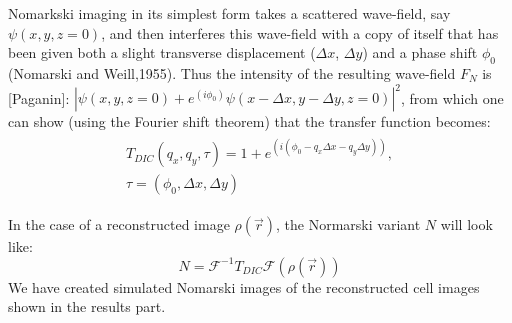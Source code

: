 Nomarkski imaging in its simplest form takes a scattered wave-field, say $\psi(x,y,z = 0)$, and then interferes this wave-field with a copy of itself that has been given both a slight transverse displacement ($\Delta x$, $\Delta y$) and a phase shift $\phi_0$ (Nomarski and Weill,1955). Thus the intensity of the resulting wave-field $F_N$ is [Paganin]:
$|\psi(x,y,z=0)+ e^{(i\phi_0)} \psi(x - \Delta x,y - \Delta y,z=0) |^2$, from which one can show (using the Fourier shift theorem) that the transfer function becomes:
\begin{equation}
\begin{aligned}
\begin{split}
T_{DIC}(q_x, q_y, \tau) = 1 + e^{(i(\phi_0 - q_x \Delta x - q_y \Delta y))},\\
\tau = (\phi_0, \Delta x, \Delta y)
\end{split}
\end{aligned}
\end{equation}

In the case of a reconstructed image $\rho(\vec{r})$, the Normarski variant $N$ will look like:
\begin{equation}
N = \mathcal{F}^{-1} T_{DIC} \mathcal{F}(\rho(\vec{r}))
\end{equation}
We have created simulated Nomarski images of the reconstructed cell images shown in the results part.



